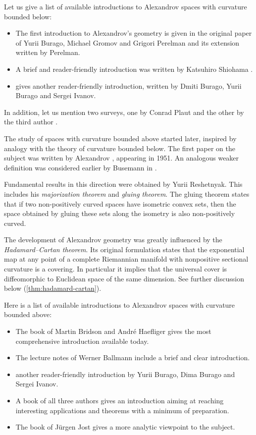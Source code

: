 Let us give a list of available introductions to  Alexandrov spaces with curvature bounded below: 
\begin{itemize}
\item The first introduction to Alexandrov's geometry is given in the original paper of Yurii Burago, Michael Gromov and Grigori Perelman \cite{BGP} 
and its extension \cite{perelman:spaces2} written by Perelman.
\item A brief and reader-friendly introduction was written by Katsuhiro Shiohama \cite[Sections 1--8]{shiohama}.
\item \cite[Chapter 10]{BBI} gives another reader-friendly introduction, written by Dmiti Burago, Yurii Burago and Sergei Ivanov.
\end{itemize}
In addition, let us mention two surveys, one by Conrad Plaut \cite{plaut:survey} and the other by the third author \cite{petrunin:survey}.

The study of  spaces with curvature bounded above started later,
inspired by analogy with the theory of curvature bounded below.
The first paper on the subject was written by Alexandrov \cite{alexandrov:strong-angle}, appearing in 1951.
An analogous weaker definition was considered earlier by Busemann in \cite{busemann-CBA}.

Fundamental results in this direction were obtained by Yurii Reshetnyak.
This includes his \emph{majorization theorem} and \emph{gluing theorem}.
The gluing theorem states that if two non-positively curved spaces have isometric convex sets, then the space obtained by gluing these sets along the isometry is also non-positively curved.

The development of Alexandrov geometry was greatly influenced by the \emph{Hadamard--Cartan theorem}.
Its original formulation states that the exponential map at any point of a complete Riemannian manifold with nonpositive sectional curvature is a covering.
In particular it implies that the universal cover is diffeomorphic to Euclidean space of the same dimension. 
See further discussion below (\ref{thm:hadamard-cartan}).

Here is a list of available introductions to Alexandrov spaces with curvature bounded above: 
\begin{itemize}
\item The book of Martin Bridson and Andr\'e Haefliger \cite{BH} gives the most comprehensive introduction available today. 
\item The lecture notes of Werner Ballmann \cite{ballmann:lectures} include a brief 
and clear
introduction.
\item \cite[Chapter 9]{BBI} another reader-friendly introduction by Yurii Burago, Dima Burago and Sergei Ivanov.
\item A book of all three authors \cite{AKP-CAT} gives an introduction aiming at reaching interesting applications and theorems with a minimum of preparation.
\item The book of J\"{u}rgen Jost \cite{jost} gives a more analytic viewpoint to the subject.
\end{itemize}


